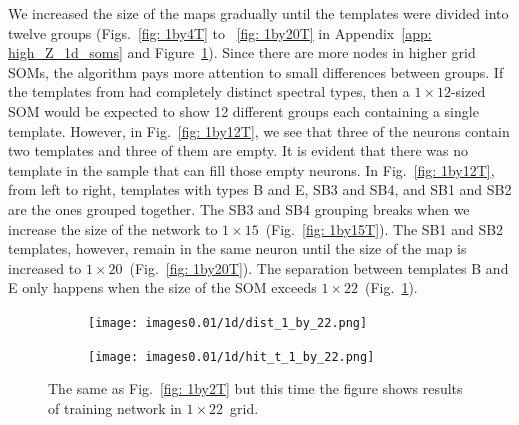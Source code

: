             We increased the size of the maps gradually until the templates were divided into twelve groups (Figs.~\ref{fig: 1by4T} to ~\ref{fig: 1by20T} in Appendix~\ref{app: high_Z_1d_soms} and Figure~\ref{fig: 1by22T}).
            Since there are more nodes in higher grid SOMs, the algorithm 
            pays more attention to small differences between groups.
            If the templates from  had completely distinct spectral types, then a $1\times12$-sized SOM would be expected to show 12 different groups each containing a single template.
            However, in Fig.~\ref{fig: 1by12T}, we see that three of the neurons contain two templates and three of them are empty.
            It is evident that there was no template in the  sample that can fill those empty neurons.
            In Fig.~\ref{fig: 1by12T}, from left to right, templates with types B and E, SB3 and SB4, and SB1 and SB2 are the ones grouped together. 
            The SB3 and SB4 grouping breaks when we increase the size of the network to $1\times15$~(Fig.~\ref{fig: 1by15T}).
            The SB1 and SB2 templates, however, remain in the same neuron until the size of the map is increased to $1\times20$~(Fig.~\ref{fig: 1by20T}).
            The separation between templates B and E only happens when the size of the SOM exceeds $1\times22$~(Fig.~\ref{fig: 1by22T}).
            \begin{figure}
                \begin{subfigure}[b]{\textwidth}
                    \centering
                    \texttt{[image: images0.01/1d/dist\_1\_by\_22.png]}
                \end{subfigure}
                \hfill
                \begin{subfigure}[b]{\textwidth}
                    \texttt{[image: images0.01/1d/hit\_t\_1\_by\_22.png]}
                \end{subfigure}
                \caption[Results of training network in $1\times22$~grid]{The same as Fig.~\ref{fig: 1by2T} but this time the figure shows results of training network in $1\times22$~grid.}
                \label{fig: 1by22T}
            \end{figure} 
    
